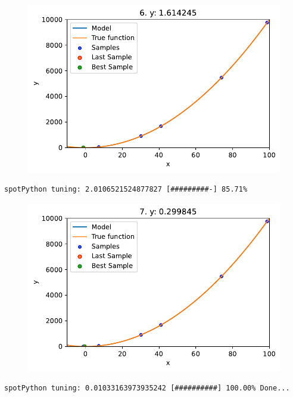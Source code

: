 \documentclass[
  letterpaper,
  DIV=11,
  numbers=noendperiod]{scrreprt}
\begin{document}
\begin{figure}[H]

{\centering \includegraphics{a_04_spot_doc_files/figure-pdf/cell-6-output-2.pdf}

}

\end{figure}

\begin{verbatim}
spotPython tuning: 2.0106521524877827 [#########-] 85.71% 
\end{verbatim}

\begin{figure}[H]

{\centering \includegraphics{a_04_spot_doc_files/figure-pdf/cell-6-output-4.pdf}

}

\end{figure}

\begin{verbatim}
spotPython tuning: 0.01033163973935242 [##########] 100.00% Done...
\end{verbatim}
\end{document}
